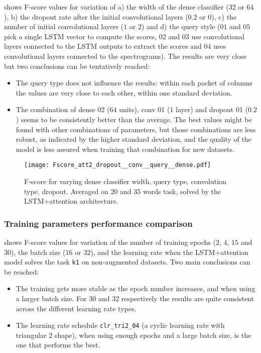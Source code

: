  shows F-score values for variation of 
%
a) the width of the dense classifier ($32$ or $64$),
%
b) the dropout rate after the initial convolutional layers ($0.2$ or $0$),
%
c) the number of initial convolutional layers ($1$ or $2$) and
%
d) the query style ($01$ and $05$ pick a single LSTM vector to compute the
scores, $02$ and $03$ use convolutional layers connected to the LSTM outputs to
extract the scores and $04$  uses convolutional layers connected to the
spectrograms).
%
The results are very close but two conclusions can be tentatively reached:

\begin{itemize}
    \item The query type does not influence the results: within each packet of
        columns the values are very close to each other, within one standard
        deviation.
    \item The combination of dense 02 ($64$ units), conv 01 ($1$ layer) and
        dropout 01 ($0.2$) seems to be consistently better than the average.
        The best values might be found with other combinations of parameters,
        but those combinations are less robust, as indicated by the higher
        standard deviation, and the quality of the model is less assured when
        training that combination for new datasets.
\end{itemize}

\begin{figure*}[t!]
    \centering
    \texttt{[image: Fscore\_att2\_dropout\_\_conv\_\_query\_\_dense.pdf]}
    \caption{F-score for varying
        dense classifier width,
        query type,
        convolution type,
        dropout.
        Averaged on 20 and 35 words task, solved by the LSTM+attention architecture.
        }%
    \label{fig:att_dropout_conv_query_dense}
\end{figure*}

\subsubsection{Training parameters performance comparison}


 shows F-score values for 
variation of 
the number of training epochs ($2$, $4$, $15$ and $30$),
the batch size ($16$ or $32$),
and the learning rate
when the LSTM+attention model solves the task \texttt{k1}
on non-augmented datasets.
Two main conclusions can be reached:
\begin{itemize}
    \item
        The training gets more stable as the epoch number increases, and when
        using a larger batch size. For $30$ and $32$ respectively the results
        are quite consistent across the different learning rate types.
    \item
        The learning rate schedule \texttt{clr\_tri2\_04} (a cyclic learning
        rate with triangular 2 shape), when using enough epochs and a large
        batch size, is the one that performs the best.
\end{itemize}

